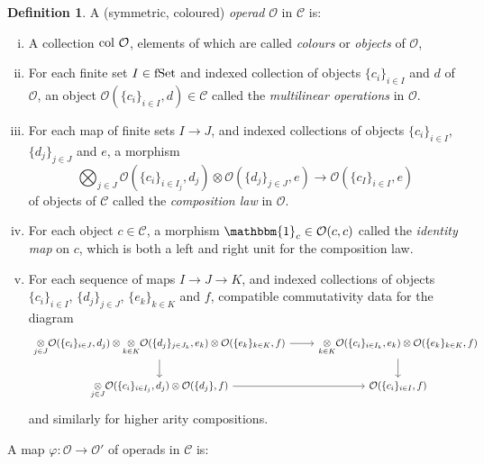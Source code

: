 \documentclass[11pt]{amsart}
\numberwithin{equation}{section}
\theoremstyle{definition}
\newtheorem{defn}[theo]{Definition}
\newcommand{\mc}{\mathcal}
\newcommand{\fset}{{\textup{fSet}}}
\newcommand{\col}{{{\textup{col }}}}
\newcommand{\0}{{\textbf{0}}}
\newcommand{\id}{{\textup{id}}}
\def\OO{{\mc O}}
\def \id{\mathbbm{1}}
\newcommand{\tensor}[1]{\underset{#1}{\otimes}}
\begin{document}
\begin{defn}\label{opdefn} A (symmetric, coloured) \emph{operad} $\mc O$ in $\mc C$ is:
	\begin{enumerate}[(i)]
		\item A collection $\col\mc O$, elements of which are called \emph{colours} or \emph{objects} of $\mc O$,
		\item For each finite set $I\in\fset$ and indexed collection of objects $\{c_i\}_{i\in I}$ and $d$ of $\mc O$, an object $\mc O(\{c_i\}_{i\in I},d)\in \mc C$ called the \emph{multilinear operations} in $\mc O$.
		\item For each map of finite sets $I\to J$, and indexed collections of objects $\{c_i\}_{i\in I}$, $\{d_j\}_{j\in J}$ and $e$, a morphism
		$$ \bigotimes_{j\in J} \mc O(\{c_i\}_{i\in I_j}, d_j)\otimes \mc O(\{d_j\}_{j\in J},e) \to \mc O(\{c_I\}_{i\in I},e)$$
		of objects of $\mc C$ called the \emph{composition law} in $\mc O$.
		\item For each object $c\in \mc C$, a morphism $\id_c\in \mc O(c,c)$ called the \emph{identity map} on $c$, which is both a left and right unit for the composition law.
		\item For each sequence of maps $I\rightarrow J \rightarrow K$, and indexed collections of objects $\{c_i\}_{i\in I}$, $\{d_j\}_{j\in J}$, $\{e_k\}_{k\in K}$ and $f$, compatible commutativity data for the diagram
		\[
		\begin{tikzcd}
		\tensor{j\in J} \OO(\{c_i\}_{i\in J},d_j)\otimes \tensor{k\in K}\OO(\{d_j\}_{j\in J_k},e_k)	\otimes \OO(\{e_k\}_{k\in K},f) \ar[r] \ar[d] & \tensor{k\in K} \OO(\{c_i\}_{i\in I_k},e_k)\otimes \OO(\{e_k\}_{k\in K},f) \ar[d] \\
		\tensor{j\in J} \OO(\{c_i\}_{i\in I_j},d_j)\otimes \OO(\{d_j\},f) \ar[r] & \OO(\{c_i\}_{i\in I},f)
		\end{tikzcd}
		\]
		and similarly for higher arity compositions.
	\end{enumerate}
	A map $\varphi: \mc O\to \mc O'$ of operads in $\mc C$ is:
	\begin{enumerate}[(i)]

\end{enumerate}
\end{defn}
\end{document}

